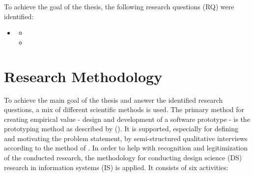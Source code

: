 
To achieve the goal of the thesis, the following research questions (RQ) were identified:

\begin{itemize}
	\item {}
	\begin{itemize}
		\item {}
		\item {}
	\end{itemize}
\end{itemize}





\vfill

\section{Research Methodology}
\label{introduction:research-methodology}

To achieve the main goal of the thesis and answer the identified research questions,
a mix of different scientific methods is used.
The primary method for creating empirical value - design and development of a software prototype - is the prototyping method as described by
\citeauthor{riedlManagementInformatik2019} (\citeyear{riedlManagementInformatik2019}).
It is supported, especially for defining and motivating the problem statement, by
semi-structured qualitative interviews according to the method of \autocite{glaser2010experteninterviews}.
%
In order to help with recognition and legitimization of the conducted research,
the methodology for conducting design science (DS) research
in information systems (IS)
\autocite{designScienceResearchMethodologyForInformationSystemsResearch}
is applied.
It consists of six activities:

